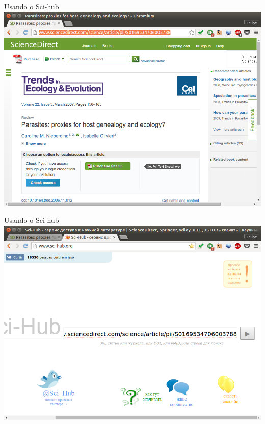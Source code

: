 \documentclass{beamer}
\begin{document}
\begin{frame}{Usando o Sci-hub}
  \centering
  \includegraphics[height=.85\textheight]{Busca/scihub-busca1}
\end{frame}

\begin{frame}{Usando o Sci-hub}
  \centering
  \includegraphics[height=.85\textheight]{Busca/scihub-busca2}
\end{frame}
\end{document}
